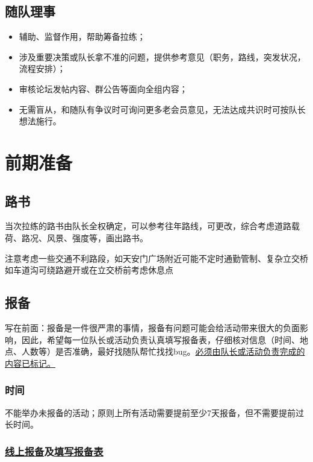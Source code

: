 \documentclass[UTF8]{ctexart}
\begin{document}
\subsection{随队理事}

\begin{itemize}[nosep,left=2em]
    \item 辅助、监督作用，帮助筹备拉练；
    \item 涉及重要决策或队长拿不准的问题，提供参考意见（职务，路线，突发状况，流程安排）；
    \item 审核论坛发帖内容、群公告等面向全组内容；
    \item 无需盲从，和随队有争议时可询问更多老会员意见，无法达成共识时可按队长想法施行。
    
\end{itemize}

\section{前期准备}

\subsection{路书}

当次拉练的路书由队长全权确定，可以参考往年路线，可更改，综合考虑道路载荷、路况、风景、强度等，画出路书。

注意考虑一些交通不利路段，如天安门广场附近可能不定时通勤管制、复杂立交桥如车道沟可绕路避开或在立交桥前考虑休息点

\subsection{报备}

写在前面：报备是一件很严肃的事情，报备有问题可能会给活动带来很大的负面影响，因此，希望每一位队长或活动负责认真填写报备表，仔细核对信息（时间、地点、人数等）是否准确，最好找随队帮忙找找bug。\underline{必须由队长或活动负责完成的内容已标记。}

\subsubsection{时间}

不能举办未报备的活动；原则上所有活动需要提前至少7天报备，但不需要提前过长时间。

\subsubsection[线上报备填写报备表]{\underline{线上报备}及\underline{填写报备表}}
\end{document}
